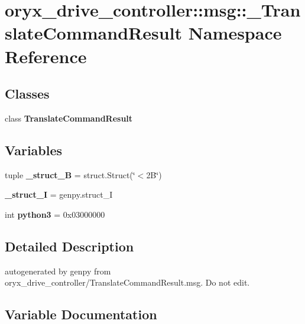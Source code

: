 \section{oryx\-\_\-drive\-\_\-controller\-:\-:msg\-:\-:\-\_\-\-Translate\-Command\-Result \-Namespace \-Reference}
\label{namespaceoryx__drive__controller_1_1msg_1_1__TranslateCommandResult}
\subsection*{\-Classes}
\begin{DoxyCompactItemize}
\item 
class {\bf \-Translate\-Command\-Result}
\end{DoxyCompactItemize}
\subsection*{\-Variables}
\begin{DoxyCompactItemize}
\item 
tuple {\bf \-\_\-struct\-\_\-B} = struct.\-Struct(\char`\"{}$<$2\-B\char`\"{})
\item 
{\bf \-\_\-struct\-\_\-\-I} = genpy.\-struct\-\_\-\-I
\item 
int {\bf python3} = 0x03000000
\end{DoxyCompactItemize}


\subsection{\-Detailed \-Description}
\begin{DoxyVerb}autogenerated by genpy from oryx_drive_controller/TranslateCommandResult.msg. Do not edit.\end{DoxyVerb}
 

\subsection{\-Variable \-Documentation}
